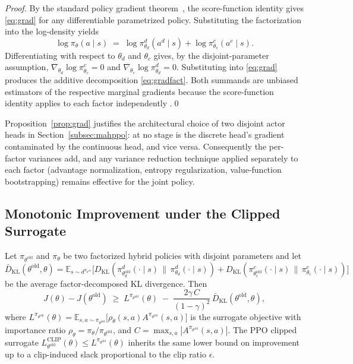 \begin{proof}
By the standard policy gradient theorem~\cite{schulman2017ppo}, the
score-function identity gives \eqref{eq:grad} for any differentiable
parametrized policy. Substituting the factorization into the log-density
yields
\begin{equation*}
\log\pi_{\theta}(a\mid s)\;=\;\log\pi^{d}_{\theta_{d}}(a^{d}\mid s)+\log\pi^{c}_{\theta_{c}}(a^{c}\mid s).
\end{equation*}
Differentiating with respect to $\theta_{d}$ and $\theta_{c}$ gives, by
the disjoint-parameter assumption,
$\nabla_{\theta_{d}}\log\pi^{c}_{\theta_{c}}=0$ and
$\nabla_{\theta_{c}}\log\pi^{d}_{\theta_{d}}=0$. Substituting into
\eqref{eq:grad} produces the additive decomposition
\eqref{eq:gradfact}. Both summands are unbiased estimators of the
respective marginal gradients because the score-function identity
applies to each factor independently
\cite{schulman2015trpo}.\qed
\end{proof}

Proposition~\ref{prop:grad} justifies the architectural choice of two
disjoint actor heads in Section~\ref{subsec:mahppo}: at no stage is the
discrete head's gradient contaminated by the continuous head, and vice
versa. Consequently the per-factor variances add, and any variance
reduction technique applied separately to each factor (advantage
normalization, entropy regularization, value-function bootstrapping)
remains effective for the joint policy.

\subsection{Monotonic Improvement under the Clipped Surrogate}\label{subsec:mono}
\begin{proposition}\label{prop:mono}
Let $\pi_{\theta^{\mathrm{old}}}$ and $\pi_{\theta}$ be two factorized
hybrid policies with disjoint parameters and let $\bar{D}_{\mathrm{KL}}(\theta^{\mathrm{old}},\theta)
=\mathbb{E}_{s\sim d^{\pi_{\theta^{\mathrm{old}}}}}\!\big[D_{\mathrm{KL}}(\pi^{d}_{\theta^{\mathrm{old}}_{d}}(\cdot\mid s)\,\|\,\pi^{d}_{\theta_{d}}(\cdot\mid s))
+ D_{\mathrm{KL}}(\pi^{c}_{\theta^{\mathrm{old}}_{c}}(\cdot\mid s)\,\|\,\pi^{c}_{\theta_{c}}(\cdot\mid s))\big]$
be the average factor-decomposed KL divergence. Then
\begin{equation}
J(\theta)-J(\theta^{\mathrm{old}})\;\geq\;
L^{\pi_{\theta^{\mathrm{old}}}}(\theta)
\;-\;\frac{2\gamma\, C}{(1-\gamma)^{2}}\,\bar{D}_{\mathrm{KL}}(\theta^{\mathrm{old}},\theta),
\label{eq:mono}
\end{equation}
where $L^{\pi_{\theta^{\mathrm{old}}}}(\theta)
=\mathbb{E}_{s,a\sim\pi_{\theta^{\mathrm{old}}}}\!\big[\rho_{\theta}(s,a)A^{\pi_{\theta^{\mathrm{old}}}}(s,a)\big]$
is the surrogate objective with importance ratio $\rho_{\theta}=
\pi_{\theta}/\pi_{\theta^{\mathrm{old}}}$, and
$C=\max_{s,a}|A^{\pi_{\theta^{\mathrm{old}}}}(s,a)|$. The PPO clipped
surrogate $L^{\mathrm{CLIP}}_{\theta^{\mathrm{old}}}(\theta)\le
L^{\pi_{\theta^{\mathrm{old}}}}(\theta)$ inherits the same lower bound
on improvement up to a clip-induced slack proportional to the clip
ratio $\epsilon$.
\end{proposition}


